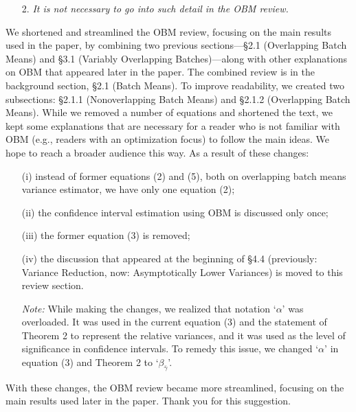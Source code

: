 \documentclass[11pt,notitlepage,onecolumn]{article}
\newcommand{\noi}{\noindent}
\begin{document}
\begin{itemize}
\item[2.] \textit{It is not necessary to go into such detail in the OBM review.}
\end{itemize}

\smallskip 

\noindent 
We shortened and streamlined the OBM review, focusing on the main results used in the paper, by combining two previous sections---\S 2.1 (Overlapping Batch Means) and \S 3.1 (Variably Overlapping Batches)---along with other explanations on OBM that appeared later in the paper. 
The combined review is in the background section, \S 2.1 (Batch Means). 
To improve readability, we created two subsections: \S 2.1.1 (Nonoverlapping Batch Means) and \S 2.1.2 (Overlapping Batch Means). 
While we removed a number of equations and shortened the text, we kept some explanations that are necessary for a reader who is not familiar with OBM (e.g., readers with an optimization focus) to follow the main ideas.   
We hope to reach a broader audience this way. 
As a result of these changes: 
\begin{itemize}
	\item[(i)]  instead of former equations (2) and (5), both on overlapping batch means variance estimator, we have only one equation (2); 
	
	\item[(ii)]  the confidence interval estimation using OBM is discussed only once;

	\item[(iii)] the former equation (3) is removed;

	\item[(iv)] the discussion that appeared at the beginning of \S 4.4 (previously: Variance Reduction, now: Asymptotically Lower Variances) is moved to this review section.\medskip 

{\it Note:} While making the changes, we realized that notation `$\alpha$' was overloaded. 
It was used in the current equation (3) and the statement of Theorem 2 to represent the relative variances, and it was used as the level of significance in confidence intervals.  
To remedy this issue, we changed `$\alpha$' in equation (3) and Theorem 2 to `$\beta_{\bar{\gamma}}$'. 
\end{itemize}

\noi
With these changes, the OBM review became more streamlined, focusing on the main results used later in the paper. 
Thank you for this suggestion.
\medskip 
\end{document}
